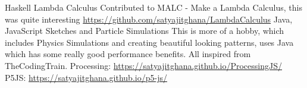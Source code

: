 \begin{cventries}
    \cventry
        {Haskell}
        {Lambda Calculus}
        {}
        {}
        {Contributed to MALC - Make a Lambda Calculus, this was quite interesting
        \url{https://github.com/satyajitghana/LambdaCalculus}
        }
    \cventry
        {Java, JavaScript}
        {Sketches and Particle Simulations}
        {}
        {}
        {
        This is more of a hobby, which includes Physics Simulations and creating beautiful looking patterns, uses Java which has some really good performance benefits. All inspired from TheCodingTrain.
        Processing: \url{https://satyajitghana.github.io/ProcessingJS/}
        P5JS: \url{https://satyajitghana.github.io/p5-js/}
        }
\end{cventries}